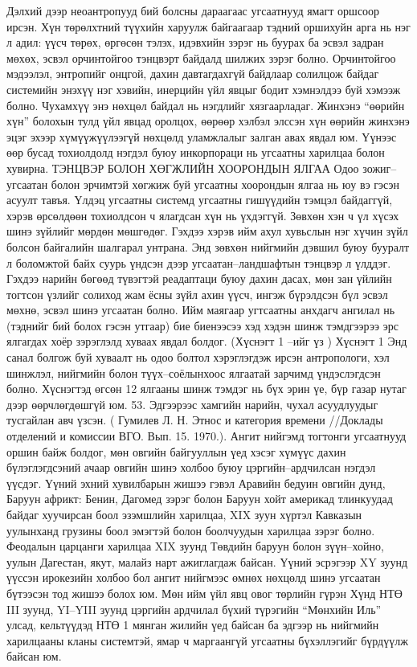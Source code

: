 Дэлхий дээр неоантропууд бий болсны дараагаас угсаатнууд ямагт оршсоор ирсэн. Хүн төрөлхтний түүхийн харуулж байгаагаар тэдний оршихуйн арга нь нэг л адил: үүсч төрөх, өргөсөн тэлэх, идэвхийн зэрэг нь буурах ба эсвэл задран мөхөх, эсвэл орчинтойгоо тэнцвэрт байдалд шилжих зэрэг болно. Орчинтойгоо мэдээлэл, энтропийг онцгой, дахин давтагдахгүй байдлаар солилцож байдаг системийн энэхүү нэг хэвийн, инерцийн үйл явцыг бодит хэмнэлдээ буй хэмээж болно. Чухамхүү энэ нөхцөл байдал нь нэгдлийг хязгаарладаг. Жинхэнэ “өөрийн хүн” болохын тулд үйл явцад оролцох, өөрөөр хэлбэл элссэн хүн өөрийн жинхэнэ эцэг эхээр хүмүүжүүлээгүй нөхцөлд уламжлалыг залган авах явдал юм. Үүнээс өөр бусад тохиолдолд нэгдэл буюу инкорпораци нь угсаатны харилцаа болон хувирна.
ТЭНЦВЭР БОЛОН ХӨГЖЛИЙН ХООРОНДЫН ЯЛГАА
Одоо зожиг–угсаатан болон эрчимтэй хөгжиж буй угсаатны хоорондын ялгаа нь юу вэ гэсэн асуулт тавъя. Үлдэц угсаатны системд угсаатны гишүүдийн тэмцэл байдаггүй, хэрэв өрсөлдөөн тохиолдсон ч ялагдсан хүн нь үхдэггүй. Зөвхөн хэн ч үл хүсэх шинэ зүйлийг мөрдөн мөшгөдөг. Гэхдээ хэрэв ийм ахул хувьслын нэг хүчин зүйл болсон байгалийн шалгарал унтрана. Энд зөвхөн нийгмийн дэвшил буюу бууралт л боломжтой байх суурь үндсэн дээр угсаатан–ландшафтын тэнцвэр л үлддэг. Гэхдээ нарийн бөгөөд түвэгтэй реадаптаци буюу дахин дасах, мөн зан үйлийн тогтсон үзлийг солиход жам ёсны зүйл ахин үүсч, ингэж бүрэлдсэн бүл эсвэл мөхнө, эсвэл шинэ угсаатан болно.
Ийм маягаар угтсаатны анхдагч ангилал нь (тэднийг бий болох гэсэн утгаар) бие биенээсээ хэд хэдэн шинж тэмдгээрээ эрс ялгагдах хоёр зэрэглэлд хуваах явдал болдог. (Хүснэгт 1 –ийг үз )
Хүснэгт 1
Энд санал болгож буй хуваалт нь одоо болтол хэрэглэгдэж ирсэн антропологи, хэл шинжлэл, нийгмийн болон түүх–соёлынхоос ялгаатай зарчимд үндэслэгдсэн болно. Хүснэгтэд өгсөн 12 ялгааны шинж тэмдэг нь бүх эрин үе, бүр газар нутаг дээр өөрчлөгдөшгүй юм. 53. Эдгээрээс хамгийн нарийн, чухал асуудлуудыг тусгайлан авч үзсэн. ( Гумилев Л. Н. Этнос и категория времени //Доклады отделений и комиссии ВГО. Вып. 15. 1970.).
Ангит нийгэмд тогтонги угсаатнууд оршин байж болдог, мөн овгийн байгууллын үед хэсэг хүмүүс дахин бүлэглэгдсэний ачаар овгийн шинэ холбоо буюу цэргийн–ардчилсан нэгдэл үүсдэг. Үүний эхний хувилбарын жишээ гэвэл Аравийн бедуин овгийн дунд, Баруун африкт: Бенин, Дагомед зэрэг болон Баруун хойт америкад тлинкуудад байдаг хуучирсан боол эзэмшлийн харилцаа, XIX зуун хүртэл Кавказын уулынханд грузины боол эмэгтэй болон боолчуудын харилцаа зэрэг болно. Феодалын царцанги харилцаа XIX зуунд Төвдийн баруун болон зүүн–хойно, уулын Дагестан, якут, малайз нарт ажиглагдаж байсан. Үүний эсрэгээр XY зуунд үүссэн ирокезийн холбоо бол ангит нийгмээс өмнөх нөхцөлд шинэ угсаатан бүтээсэн тод жишээ болох юм. Мөн ийм үйл явц овог төрлийн гүрэн Хүнд НТӨ III зуунд, YI–YIII зуунд цэргийн ардчилал бүхий түрэгийн “Мөнхийн Иль” улсад, кельтүүдэд НТӨ 1 мянган жилийн үед байсан ба эдгээр нь нийгмийн харилцааны кланы системтэй, ямар ч маргаангүй угсаатны бүхэллэгийг бүрдүүлж байсан юм.
